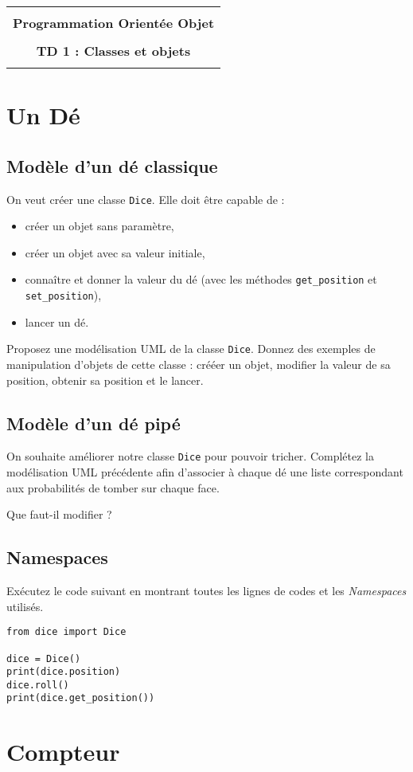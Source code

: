 \documentclass[12pt]{article}
\begin{document}
    \begin{center}
      \begin{tabular}{c}
      \hline
    \\
        {\bf \textsf {\Large Programmation Orientée Objet}}\\
    \\
        {\bf \textsf {\Large TD 1 : Classes et objets}}\\
    \\
        \hline
      \end{tabular}
    \end{center}
    \vspace{15mm}

\section{Un Dé}

\subsection{Modèle d'un dé classique}

On veut créer une classe \verb|Dice|. Elle doit être capable de :
\begin{itemize}
	\item créer un objet sans paramètre,
	\item créer un objet avec sa valeur initiale,
	\item connaître et donner la valeur du dé (avec les méthodes \verb|get_position| et \verb|set_position|),
	\item lancer un dé.
\end{itemize}

Proposez une modélisation UML de la classe \verb|Dice|. Donnez des exemples de manipulation d'objets de cette classe :
crééer un objet, modifier la valeur de sa position, obtenir sa position et le lancer.

\subsection{Modèle d'un dé pipé}

On souhaite améliorer notre classe \verb|Dice| pour pouvoir tricher. Complétez la modélisation UML précédente afin d'associer à chaque dé une liste correspondant aux probabilités de tomber sur chaque face.

Que faut-il modifier ?


\subsection{Namespaces}

Exécutez le code suivant en montrant toutes les lignes de codes et les {\em Namespaces} utilisés.

\lstset{language=Python}
\begin{lstlisting}
from dice import Dice

dice = Dice()
print(dice.position)
dice.roll()
print(dice.get_position())
\end{lstlisting}

\section{Compteur}
\end{document}
